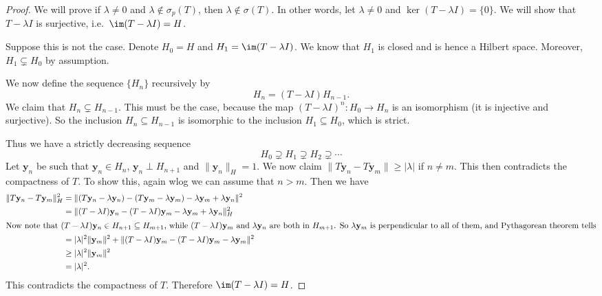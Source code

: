 \documentclass[a4paper]{article}
\begin{document}
\begin{proof}
  We will prove if $\lambda \not= 0$ and $\lambda \not\in \sigma_p(T)$, then $\lambda\not\in \sigma(T)$. In other words, let $\lambda \not= 0$ and $\ker (T - \lambda I) = \{0\}$. We will show that $T - \lambda I$ is surjective, i.e.\ $\im (T - \lambda I) = H$.

  Suppose this is not the case. Denote $H_0 = H$ and $H_1 = \im (T - \lambda I)$. We know that $H_1$ is closed and is hence a Hilbert space. Moreover, $H_1 \subsetneq H_0$ by assumption.

  We now define the sequence $\{H_n\}$ recursively by
  \[
    H_n = (T - \lambda I) H_{n - 1}.
  \]
  We claim that $H_n \subsetneq H_{n - 1}$. This must be the case, because the map $(T - \lambda I)^n: H_0 \to H_n$ is an isomorphism (it is injective and surjective). So the inclusion $H_n \subseteq H_{n - 1}$ is isomorphic to the inclusion $H_1 \subseteq H_0$, which is strict.

  Thus we have a strictly decreasing sequence
  \[
    H_0 \supsetneq H_1 \supsetneq H_2 \supsetneq \cdots
  \]
  Let $\mathbf{y}_n$ be such that $\mathbf{y}_n \in H_n$, $\mathbf{y}_n \perp H_{n + 1}$ and $\|\mathbf{y}_n\|_H = 1$. We now claim $\|T \mathbf{y}_n - T \mathbf{y}_m\| \geq |\lambda|$ if $n \not= m$. This then contradicts the compactness of $T$. To show this, again wlog we can assume that $n > m$. Then we have
  \begin{align*}
    \|T \mathbf{y}_n - T \mathbf{y}_m\|_H^2 &= \|(T \mathbf{y}_n - \lambda\mathbf{y}_n) - (T \mathbf{y}_m - \lambda\mathbf{y}_m) - \lambda\mathbf{y}_m + \lambda\mathbf{y}_n\|^2\\
    &= \|(T - \lambda I) \mathbf{y}_n - (T - \lambda I) \mathbf{y}_m - \lambda \mathbf{y}_m + \lambda \mathbf{y}_n\|^2_H\\
    \intertext{Now note that $(T - \lambda I)\mathbf{y} _n \in H_{n + 1}\subseteq H_{m + 1}$, while $(T - \lambda I)\mathbf{y}_m$ and $\lambda \mathbf{y}_n$ are both in $H_{m + 1}$. So $\lambda \mathbf{y}_m$ is perpendicular to all of them, and Pythagorean theorem tells}
    &= |\lambda|^2 \|\mathbf{y}_m\|^2 + \|(T - \lambda I)\mathbf{y}_m - (T - \lambda I)\mathbf{y}_m - \lambda \mathbf{y}_m\|^2\\
    &\geq |\lambda|^2 \|\mathbf{y}_m\|^2\\
    &= |\lambda|^2.
  \end{align*}
  This contradicts the compactness of $T$. Therefore $\im (T - \lambda I) = H$.
\end{proof}
\end{document}
